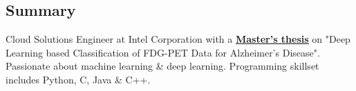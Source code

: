 \documentclass[hidelinks,letterpaper]{deedy-resume-openfont} %
\begin{document}

\lastupdated %


\sectionsep
\subsection{Summary}
Cloud Solutions Engineer at Intel Corporation with a \href{https://repository.asu.edu/attachments/186430/content/Singh_asu_0010N_16846.pdf}{\bf\underline{Master's thesis}} on "Deep Learning based Classification of FDG-PET Data for Alzheimer's Disease". Passionate about machine learning \& deep learning. Programming skillset includes Python, C, Java \& C++.
\end{document}
